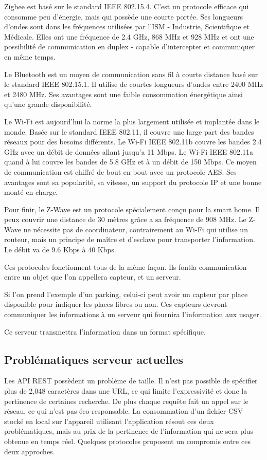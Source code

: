 Zigbee est basé sur le standard IEEE 802.15.4.
C'est un protocole efficace qui consomme peu d'énergie, mais qui possède une courte portée.
Ses longueurs d'ondes sont dans les fréquences utilisées par l'ISM - Industrie, Scientifique et Médicale.
Elles ont une fréquence de 2.4 GHz, 868 MHz et 928 MHz et ont une possibilité de communication en duplex
- capable d'intercepter et communiquer en même temps.


Le Bluetooth est un moyen de communication sans fil à courte distance basé sur le standard
IEEE 802.15.1.
Il utilise de courtes longueurs d'ondes entre 2400 MHz et 2480 MHz.
Ses avantages sont une faible consommation énergétique ainsi qu'une grande disponibilité.

Le Wi-Fi est aujourd'hui la norme la plus largement utilisée et implantée dans le monde.
Basée sur le standard IEEE 802.11, il couvre une large part des bandes réseaux pour des
besoins différents.
Le Wi-Fi IEEE 802.11b couvre les bandes 2.4 GHz avec un débit de données allant jusqu'a 11 Mbps.
Le Wi-Fi IEEE 802.11a quand à lui couvre les bandes de 5.8 GHz et à un débit de 150 Mbps.
Ce moyen de communication est chiffré de bout en bout avec un protocole AES.
Ses avantages sont sa popularité, sa vitesse, un support du protocole IP et une bonne monté en charge.

Pour finir, le Z-Wave est un protocole spécialement conçu pour la smart home.
Il peux couvrir une distance de 30 mètres grâce a sa fréquence de 908 MHz.
Le Z-Wave ne nécessite pas de coordinateur, contrairement au Wi-Fi qui utilise
un routeur, mais un principe de maître et d'esclave pour transporter l'information.
Le débit va de 9.6 Kbps à 40 Kbps.

Ces protocoles fonctionnent tous de la même façon. Ils fontla communication entre un objet que l'on appellera capteur, et un
serveur.

Si l'on prend l'exemple d'un parking, celui-ci peut avoir un capteur par place disponible pour indiquer
les places libres ou non.
Ces capteurs devront communiquer les informations à un serveur qui fournira l'information
aux usager.

Ce serveur transmettra l'information dans un format spécifique.

\subsection{Problématiques serveur actuelles}

Les API REST possèdent un problème de taille. Il n'est pas possible de spécifier plus de
2,048 caractères dans une URL, ce qui limite l'expressivité et donc la pertinence de certaines recherche.
De plus chaque requête fait un appel sur le réseau, ce qui n'est pas éco-responsable.
La consommation d'un fichier CSV stocké en local sur l'appareil utilisant l'application résout ces deux problématiques,
mais au prix de la pertinence de l'information qui ne sera plus obtenue en temps réel.
Quelques protocoles proposent un compromis entre ces deux approches.

